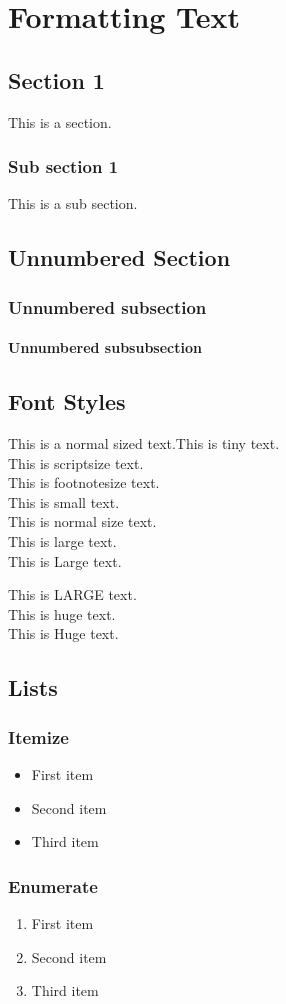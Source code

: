 \chapter{Formatting Text}
\section{Section 1}
This is a section.
\subsection{Sub section 1}
This is a sub section.
\section*{Unnumbered Section}
\subsection*{Unnumbered subsection}
\subsubsection*{Unnumbered subsubsection}

\section{Font Styles}

This is a normal sized text.{\tiny This is tiny text.} \\
{\scriptsize This is scriptsize text.} \\
{\footnotesize This is footnotesize text.} \\
{\small This is small text.} \\
{\normalsize This is normal size text.} \\
{\large This is large text.} \\
{\Large This is Large text.} 

\vspace*{2em}
{\LARGE This is LARGE text.} \\
{\huge This is huge text.} \\
{\Huge This is Huge text.}
\newpage
\section{Lists}
\subsection{Itemize}
\begin{itemize}
  \item First item
  \item Second item
  \item Third item
\end{itemize}

\subsection{Enumerate}

\begin{enumerate}
  \item First item
  \item Second item
  \item Third item
\end{enumerate}
